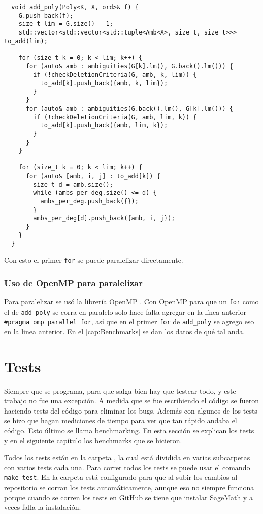 \documentclass[12pt]{report}
\theoremstyle{customstyle}
\theoremstyle{factstyle}
\begin{document}
\begin{verbatim}
  void add_poly(Poly<K, X, ord>& f) {
    G.push_back(f);
    size_t lim = G.size() - 1;
    std::vector<std::vector<std::tuple<Amb<X>, size_t, size_t>>> to_add(lim);

    for (size_t k = 0; k < lim; k++) {
      for (auto& amb : ambiguities(G[k].lm(), G.back().lm())) {
        if (!checkDeletionCriteria(G, amb, k, lim)) {
          to_add[k].push_back({amb, k, lim});
        }
      }
      for (auto& amb : ambiguities(G.back().lm(), G[k].lm())) {
        if (!checkDeletionCriteria(G, amb, lim, k)) {
          to_add[k].push_back({amb, lim, k});
        }
      }
    }

    for (size_t k = 0; k < lim; k++) {
      for (auto& [amb, i, j] : to_add[k]) {
        size_t d = amb.size();
        while (ambs_per_deg.size() <= d) {
          ambs_per_deg.push_back({});
        }
        ambs_per_deg[d].push_back({amb, i, j});
      }
    }
  }
\end{verbatim}

Con esto el primer \texttt{for} se puede paralelizar directamente.

\subsection{Uso de OpenMP para paralelizar}

Para paralelizar se usó la librería OpenMP \cite{lib:openmp}. Con OpenMP para que un \texttt{for} como el de \texttt{add\_poly} se corra en paralelo solo hace falta agregar en la línea anterior \texttt{\#pragma omp parallel for}, así que en el primer \texttt{for} de \texttt{add\_poly} se agrego eso en la linea anterior. En el \cref{cap:Benchmarks} se dan los datos de qué tal anda.

\chapter{Tests}

Siempre que se programa, para que salga bien hay que testear todo, y este trabajo no fue una excepción. A medida que se fue escribiendo el código se fueron haciendo tests del código para eliminar los bugs. Además con algunos de los tests se hizo que hagan mediciones de tiempo para ver que tan rápido andaba el código. Esto último se llama benchmarking. En esta sección se explican los tests y en el siguiente capítulo los benchmarks que se hicieron.

Todos los tests están en la carpeta , la cual está dividida en varias subcarpetas con varios tests cada una. Para correr todos los tests se puede usar el comando \texttt{make test}. En la carpeta  está configurado para que al subir los cambios al repositorio se corran los tests automáticamente, aunque eso no siempre funciona porque cuando se corren los tests en GitHub se tiene que instalar SageMath y a veces falla la instalación.
\end{document}
